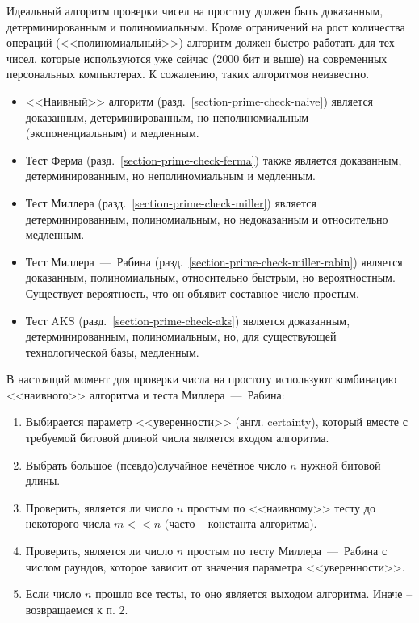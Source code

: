 Идеальный алгоритм проверки чисел на простоту должен быть доказанным, детерминированным и полиномиальным. Кроме ограничений на рост количества операций (<<полиномиальный>>) алгоритм должен быстро работать для тех чисел, которые используются уже сейчас (2000 бит и выше) на современных персональных компьютерах. К сожалению, таких алгоритмов неизвестно.

\begin{itemize}
	\item <<Наивный>> алгоритм (разд.~\ref{section-prime-check-naive}) является доказанным, детерминированным, но неполиномиальным (экспоненциальным) и медленным.
	\item Тест Ферма (разд.~\ref{section-prime-check-ferma}) также является доказанным, детерминированным, но неполиномиальным и медленным.
	\item Тест Миллера (разд.~\ref{section-prime-check-miller}) является детерминированным, полиномиальным, но недоказанным и относительно медленным.
	\item Тест Миллера~---~Рабина (разд.~\ref{section-prime-check-miller-rabin}) является доказанным, полиномиальным, относительно быстрым, но вероятностным. Существует вероятность, что он объявит составное число простым.
	\item Тест AKS (разд.~\ref{section-prime-check-aks}) является доказанным, детерминированным, полиномиальным, но, для существующей технологической базы, медленным.
\end{itemize}

В настоящий момент для проверки числа на простоту используют комбинацию <<наивного>> алгоритма и теста Миллера~---~Рабина:

\begin{enumerate}
	\item Выбирается параметр <<уверенности>> (англ. certainty), который вместе с требуемой битовой длиной числа является входом алгоритма.
	\item Выбрать большое (псевдо)случайное нечётное число $n$ нужной битовой длины.
	\item Проверить, является ли число $n$ простым по <<наивному>> тесту до некоторого числа $m << n$ (часто -- константа алгоритма).
	\item Проверить, является ли число $n$ простым по тесту Миллера~---~Рабина с числом раундов, которое зависит от значения параметра <<уверенности>>.
	\item Если число $n$ прошло все тесты, то оно является выходом алгоритма. Иначе -- возвращаемся к п. 2.
\end{enumerate}

